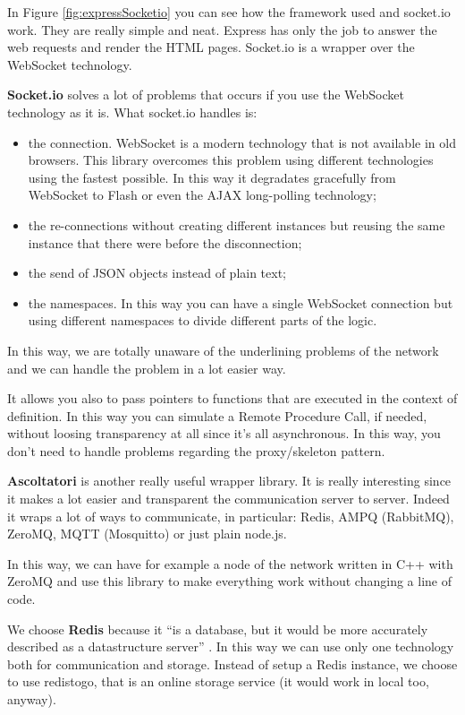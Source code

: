 In Figure \ref{fig:expressSocketio} you can see how the framework used and socket.io work. They are really simple and neat. Express has only the job to answer the web requests and render the HTML pages. Socket.io is a wrapper over the WebSocket technology.

\textbf{Socket.io} solves a lot of problems that occurs if you use the WebSocket technology as it is. What socket.io handles is:
\begin{itemize}
\item the connection. WebSocket is a modern technology that is not available in old browsers. This library overcomes this problem using different technologies using the fastest possible. In this way it degradates gracefully from WebSocket to Flash or even the AJAX long-polling technology;
\item the re-connections without creating different instances but reusing the same instance that there were before the disconnection;
\item the send of JSON objects instead of plain text;
\item the namespaces. In this way you can have a single WebSocket connection but using different namespaces to divide different parts of the logic.
\end{itemize}

In this way, we are totally unaware of the underlining problems of the network and we can handle the problem in a lot easier way.

It allows you also to pass pointers to functions that are executed in the context of definition. In this way you can simulate a Remote Procedure Call, if needed, without loosing transparency at all since it's all asynchronous. In this way, you don't need to handle problems regarding the proxy/skeleton pattern.

\textbf{Ascoltatori} is another really useful wrapper library. It is really interesting since it makes a lot easier and transparent the communication server to server. Indeed it wraps a lot of ways to communicate, in particular: Redis, AMPQ (RabbitMQ), ZeroMQ, MQTT (Mosquitto) or just plain node.js.

In this way, we can have for example a node of the network written in C++ with ZeroMQ and use this library to make everything work without changing a line of code.

We choose \textbf{Redis} because it ``is a database, but it would be more accurately described as a datastructure server'' \cite{book:smashing}. In this way we can use only one technology both for communication and storage. Instead of setup a Redis instance, we choose to use redistogo, that is an online storage service (it would work in local too, anyway).

